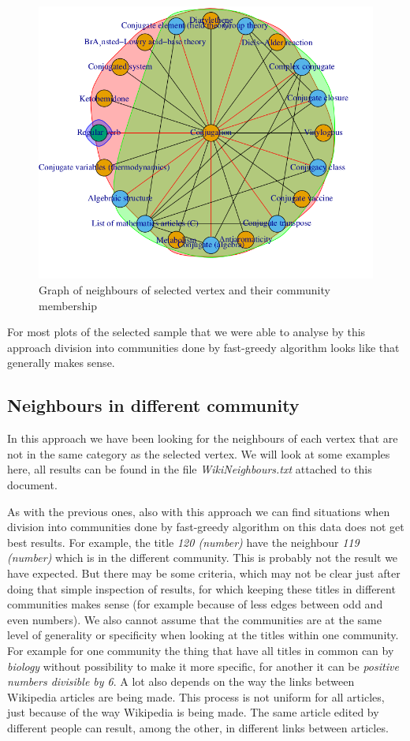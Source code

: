 \documentclass[paper=a4, fontsize=11pt]{scrartcl} %
\begin{document}
\begin{figure}
	\centering
	\includegraphics[scale=0.4,keepaspectratio]{Neighbours65}
	\caption{Graph of neighbours of selected vertex and their community membership}
	\label{Neighbours65}
\end{figure}

For most plots of the selected sample that we were able to analyse by this approach division into communities done by fast-greedy algorithm looks like that generally makes sense. 

\subsection{Neighbours in different community}
In this approach we have been looking for the neighbours of each vertex that are not in the same category as the selected vertex. We will look at some examples here, all results can be found in the file \textit{WikiNeighbours.txt} attached to this document.

As with the previous ones, also with this approach we can find situations when division into communities done by fast-greedy algorithm on this data does not get best results. For example, the title \textit{120 (number)} have the neighbour \textit{119 (number)} which is in the different community. This is probably not the result we have expected. But there may be some criteria, which may not be clear just after doing that simple inspection of results, for which keeping these titles in different communities makes sense (for example because of less edges between odd and even numbers). We also cannot assume that the communities are at the same level of generality or specificity when looking at the titles within one community. For example for one community the thing that have all titles in common can by \textit{biology} without possibility to make it more specific, for another it can be \textit{positive numbers divisible by 6}. A lot also depends on the way the links between Wikipedia articles are being made. This process is not uniform for all articles, just because of the way Wikipedia is being made. The same article edited by different people can result, among the other, in different links between articles.
\end{document}
